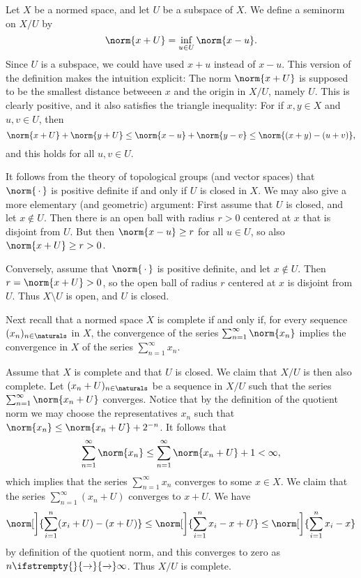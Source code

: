 \documentclass[article, a4paper, 11pt, oneside]{memoir}
\numberwithin{equation}{chapter}
\renewcommand\to[1][]{%
    \ifstrempty{#1}{%
        \rightarrow
    }{%
        \xrightarrow[#1]{}
    }%
}
\begin{document}
\begin{remark}
    Let $X$ be a normed space, and let $U$ be a subspace of $X$. We define a seminorm on $X/U$ by
    \begin{equation*}
        \norm{x + U}
            = \inf_{u \in U} \norm{x - u}.
    \end{equation*}
    Since $U$ is a subspace, we could have used $x + u$ instead of $x - u$. This version of the definition makes the intuition explicit: The norm $\norm{x + U}$ is supposed to be the smallest distance betweeen $x$ and the origin in $X/U$, namely $U$. This is clearly positive, and it also satisfies the triangle inequality: For if $x,y \in X$ and $u,v \in U$, then
    \begin{equation*}
        \norm{x + U} + \norm{y + U}
            \leq \norm{x - u} + \norm{y - v}
            \leq \norm{(x + y) - (u + v)},
    \end{equation*}
    and this holds for all $u,v \in U$.

    It follows from the theory of topological groups (and vector spaces) that $\norm{\,\cdot\,}$ is positive definite if and only if $U$ is closed in $X$. We may also give a more elementary (and geometric) argument: First assume that $U$ is closed, and let $x \not\in U$. Then there is an open ball with radius $r > 0$ centered at $x$ that is disjoint from $U$. But then $\norm{x - u} \geq r$ for all $u \in U$, so also $\norm{x + U} \geq r > 0$.

    Conversely, assume that $\norm{\,\cdot\,}$ is positive definite, and let $x \not\in U$. Then $r = \norm{x + U} > 0$, so the open ball of radius $r$ centered at $x$ is disjoint from $U$. Thus $X \setminus U$ is open, and $U$ is closed.

    Next recall that a normed space $X$ is complete if and only if, for every sequence $(x_n)_{n \in \naturals}$ in $X$, the convergence of the series $\sum_{n=1}^\infty \norm{x_n}$ implies the convergence in $X$ of the series $\sum_{n=1}^\infty x_n$.
    
    Assume that $X$ is complete and that $U$ is closed. We claim that $X/U$ is then also complete. Let $(x_n + U)_{n\in\naturals}$ be a sequence in $X/U$ such that the series $\sum_{n=1}^\infty \norm{x_n + U}$ converges. Notice that by the definition of the quotient norm we may choose the representatives $x_n$ such that $\norm{x_n} \leq \norm{x_n+U} + 2^{-n}$. It follows that
    \begin{equation*}
        \sum_{n=1}^\infty \norm{x_n}
            \leq \sum_{n=1}^\infty \norm{x_n + U} + 1
            < \infty,
    \end{equation*}
    which implies that the series $\sum_{n=1}^\infty x_n$ converges to some $x \in X$. We claim that the series $\sum_{n=1}^\infty (x_n+U)$ converges to $x + U$. We have
    \begin{equation*}
        \norm[\bigg]{ \sum_{i=1}^n (x_i + U) - (x + U) }
            \leq \norm[\bigg]{ \sum_{i=1}^n x_i - x + U }
            \leq \norm[\bigg]{ \sum_{i=1}^n x_i - x }
    \end{equation*}
    by definition of the quotient norm, and this converges to zero as $n \to \infty$. Thus $X/U$ is complete.


\end{remark}
\end{document}
